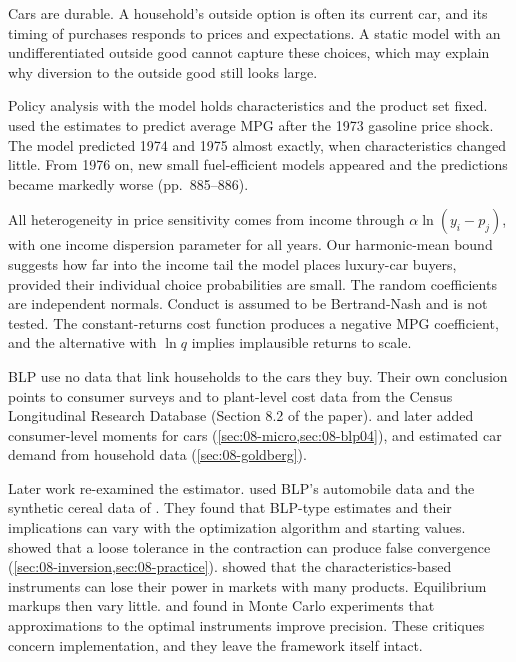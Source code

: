 Cars are durable. A household's outside option is often its current car, and its timing of purchases
responds to prices and expectations. A static model with an undifferentiated outside good cannot capture
these choices, which may explain why diversion to the outside good still looks large.

Policy analysis with the model holds characteristics and the product set fixed. \citet{PakesBerryLevinsohn1993}
used the estimates to predict average MPG after the 1973 gasoline price shock. The model predicted 1974
and 1975 almost exactly, when characteristics changed little. From 1976 on, new small fuel-efficient
models appeared and the predictions became markedly worse (pp.~885--886).

All heterogeneity in price sensitivity comes from income through $\alpha\ln(y_i-p_j)$, with one income
dispersion parameter for all years. Our harmonic-mean bound suggests how far into the income tail the model
places luxury-car buyers, provided their individual choice probabilities are small. The random coefficients are independent normals. Conduct is assumed
to be Bertrand-Nash and is not tested. The constant-returns cost function produces a negative MPG
coefficient, and the alternative with $\ln q$ implies implausible returns to scale.

BLP use no data that link households to the cars they buy. Their own conclusion points to consumer
surveys and to plant-level cost data from the Census Longitudinal Research Database (Section 8.2 of the paper).
\citet{BerryLevinsohnPakes2004} and \citet{Petrin2002} later added consumer-level moments for cars
(\cref{sec:08-micro,sec:08-blp04}), and \citet{Goldberg1995} estimated car demand from household data
(\cref{sec:08-goldberg}).

Later work re-examined the estimator. \citet[p.~35]{KnittelMetaxoglou2014} used BLP's automobile data and the
synthetic cereal data of \citet{Nevo2000a}. They found that BLP-type estimates and their implications can vary
with the optimization algorithm and starting values.
\citet{DubeFoxSu2012} showed that a loose tolerance in the contraction can produce false convergence
(\cref{sec:08-inversion,sec:08-practice}). \citet[Section~3]{Armstrong2016} showed that the characteristics-based
instruments can lose their power in markets with many products. Equilibrium markups then vary little.
\citet{ReynaertVerboven2014} and \citet[Section~5]{ConlonGortmaker2020} found in Monte Carlo experiments that
approximations to the optimal instruments improve precision.
These critiques concern implementation, and they leave the framework itself intact.

